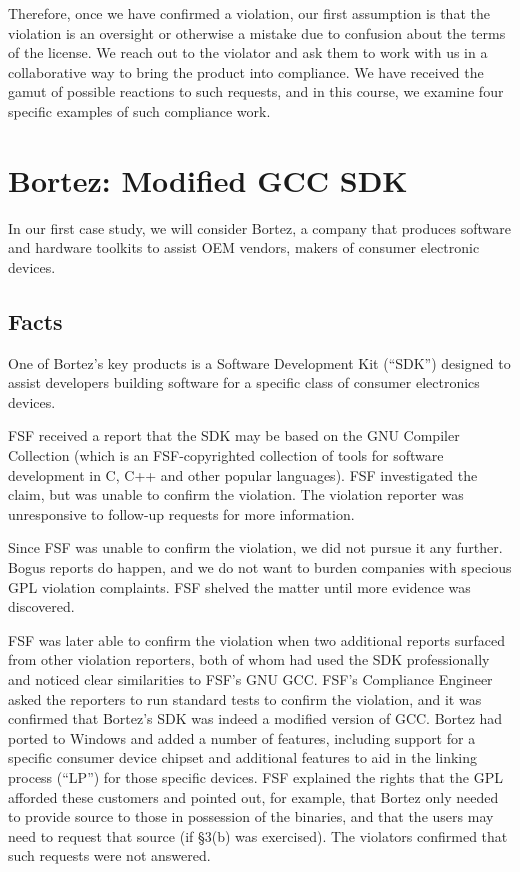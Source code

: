 Therefore, once we have confirmed a violation, our first assumption is
that the violation is an oversight or otherwise a mistake due to confusion
about the terms of the license. We reach out to the violator and ask them
to work with us in a collaborative way to bring the product into
compliance. We have received the gamut of possible reactions to such
requests, and in this course, we examine four specific examples of such
compliance work.


\chapter{Bortez: Modified GCC SDK}

In our first case study, we will consider Bortez, a company that
produces software and hardware toolkits to assist OEM vendors, makers
of consumer electronic devices.

\section{Facts}

One of Bortez's key products is a Software Development Kit (``SDK'')
designed to assist developers building software for a specific class of
consumer electronics devices.

FSF received a report that the SDK may be based on the GNU Compiler
Collection (which is an FSF-copyrighted collection of tools for software
development in C, C++ and other popular languages). FSF investigated the
claim, but was unable to confirm the violation. The violation reporter
was unresponsive to follow-up requests for more information.

Since FSF was unable to confirm the violation, we did not pursue it any
further. Bogus reports do happen, and we do not want to burden companies
with specious GPL violation complaints. FSF shelved the matter until
more evidence was discovered.

FSF was later able to confirm the violation when two additional reports
surfaced from other violation reporters, both of whom had used the SDK
professionally and noticed clear similarities to FSF's GNU GCC\@. FSF's
Compliance Engineer asked the reporters to run standard tests to confirm
the violation, and it was confirmed that Bortez's SDK was indeed a
modified version of GCC\@. Bortez had ported to Windows and added a number
of features, including support for a specific consumer device chipset and
additional features to aid in the linking process (``LP'') for those
specific devices. FSF explained the rights that the GPL afforded these
customers and pointed out, for example, that Bortez only needed to provide
source to those in possession of the binaries, and that the users may need
to request that source (if \S 3(b) was exercised). The violators
confirmed that such requests were not answered.

